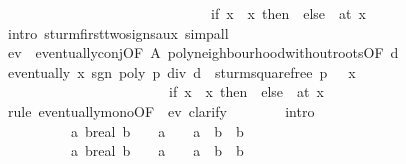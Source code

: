 \begin{isabellebody}
\ \ \ \ \ \ \ \ \ \ \ \ \ \ \ \ \ \ \ \ \ \ \ \ \ \ \ \ \ \ {\isacharparenleft}if\ x\ {\isacharless}\ x\ then\ {}\ else\ {\isacharminus}{}{\isacharparenright}{\isacharparenright}\ {\isacharparenleft}at\ x\isanewline
\ \ \ \ \ \ \isamarkupfalse%
\ {\isacharparenleft}intro\ sturm{\isacharunderscore}firsttwo{\isacharunderscore}signs{\isacharunderscore}aux{\isacharcomma}\ simp{\isacharunderscore}all{\isacharparenright}\isanewline
\ \ \isamarkupfalse%
\ ev\ {\isacharequal}\ eventually{\isacharunderscore}conj{\isacharbrackleft}OF\ A\ poly{\isacharunderscore}neighbourhood{\isacharunderscore}without{\isacharunderscore}roots{\isacharbrackleft}OF\ {\isacharbackquoteopen}d\ {\isasymnoteq}\ {}{\isacharbackquoteclose}{\isacharbrackright}{\isacharbrackright}\isanewline
\isanewline
\ \ \isamarkupfalse%
\ {\isachardoublequoteopen}eventually\ {\isacharparenleft}{\isasymlambda}x{\isachardot}\ sgn\ {\isacharparenleft}poly\ {\isacharparenleft}p\ div\ d\ {\isacharasterisk}\ sturm{\isacharunderscore}squarefree{\isacharprime}\ p\ {\isacharbang}\ {}{\isacharparenright}\ x{\isacharparenright}\ {\isacharequal}\isanewline
\ \ \ \ \ \ \ \ \ \ \ \ \ \ \ \ \ \ \ \ \ \ \ \ {\isacharparenleft}if\ x\ {\isacharless}\ x\ then\ {}\ else\ {\isacharminus}{}{\isacharparenright}{\isacharparenright}\ {\isacharparenleft}at\ x\isanewline
\ \ \isamarkupfalse%
\ {\isacharparenleft}rule\ eventually{\isacharunderscore}mono{\isacharbrackleft}OF\ {\isacharunderscore}\ ev{\isacharbrackright}{\isacharcomma}\ clarify{\isacharparenright}\isanewline
\ \ \ \ \ \ \isamarkupfalse%
\ {\isacharbrackleft}intro{\isacharbrackright}{\isacharcolon}\isanewline
\ \ \ \ \ \ \ \ \ \ {\isachardoublequoteopen}{\isasymAnd}a\ {\isacharparenleft}b{\isacharcolon}{\isacharcolon}real{\isacharparenright}{\isachardot}\ b\ {\isasymnoteq}\ {}\ {\isasymLongrightarrow}\ a\ {\isacharless}\ {}\ {\isasymLongrightarrow}\ a\ {\isacharslash}\ {\isacharparenleft}b\ {\isacharasterisk}\ b{\isacharparenright}\ {\isacharless}\ {}{\isachardoublequoteclose}\isanewline
\ \ \ \ \ \ \ \ \ \ {\isachardoublequoteopen}{\isasymAnd}a\ {\isacharparenleft}b{\isacharcolon}{\isacharcolon}real{\isacharparenright}{\isachardot}\ b\ {\isasymnoteq}\ {}\ {\isasymLongrightarrow}\ a\ {\isachargreater}\ {}\ {\isasymLongrightarrow}\ a\ {\isacharslash}\ {\isacharparenleft}b\ {\isacharasterisk}\ b{\isacharparenright}\ {\isachargreater}\ {}{\isachardoublequoteclose}\isanewline

\end{isabellebody}
